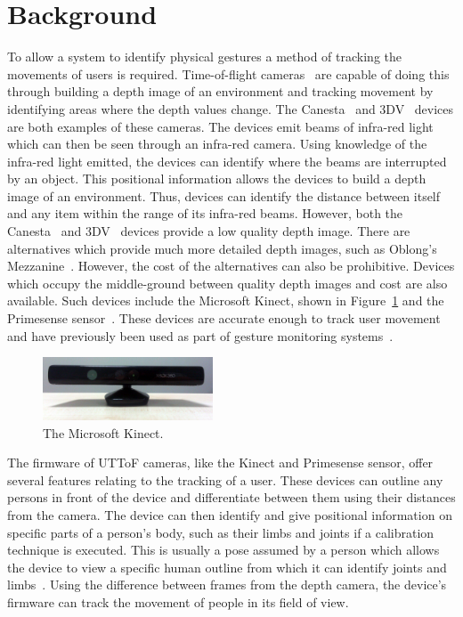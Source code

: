 \documentclass[manuscript, review, screen]{acmart}
\begin{document}

\section{Background} 
\label{sec:related}

To allow a system to identify physical gestures a method of tracking the movements of users is required.
Time-of-flight cameras~\cite{Lange2001} are capable of doing this through building a depth image of an environment and tracking movement by identifying areas where the depth values change.
The Canesta~\cite{Yang2007} and 3DV~\cite{Wilson2007a} devices are both examples of these cameras.
The devices emit beams of infra-red light which can then be seen through an infra-red camera.
Using knowledge of the infra-red light emitted, the devices can identify where the beams are interrupted by an object.
This positional information allows the devices to build a depth image of an environment.
Thus, devices can identify the distance between itself and any item within the range of its infra-red beams.
However, both the Canesta~\cite{Yang2007} and 3DV~\cite{Wilson2007a} devices provide a low quality depth image.
There are alternatives which provide much more detailed depth images, such as Oblong's Mezzanine~\cite{kramer2011}.
However, the cost of the alternatives can also be prohibitive.
Devices which occupy the middle-ground between quality depth images and cost are also available.
Such devices include the Microsoft Kinect, shown in Figure~\ref{fig:kinect} and the Primesense sensor~\cite{Wilson2010}.
These devices are accurate enough to track user movement and have previously been used as part of gesture monitoring systems~\cite{Goth2011}.

\begin{figure}[h]
   \centering
   \includegraphics[width=0.45\textwidth]{figures/kinect.png}
   \caption{The Microsoft Kinect.}
   \label{fig:kinect}
\end{figure}

The firmware of \ac{UTToF} cameras, like the Kinect and Primesense sensor, offer several features relating to the tracking of a user.
These devices can outline any persons in front of the device and differentiate between them using their distances from the camera.
The device can then identify and give positional information on specific parts of a person's body, such as their limbs and joints if a calibration technique is executed.
This is usually a pose assumed by a person which allows the device to view a specific human outline from which it can identify joints and limbs~\cite{Xia2011}.
Using the difference between frames from the depth camera, the device's firmware can track the movement of people in its field of view.
\end{document}
